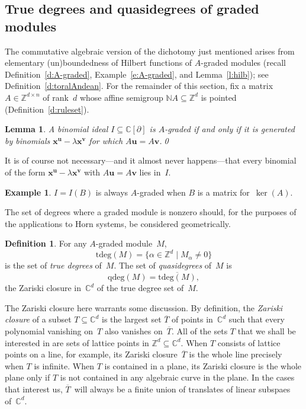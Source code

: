 \documentclass[12pt]{amsart}
\numberwithin{equation}{section}
\newtheorem{lemma}[thm]{Lemma}
\theoremstyle{definition}
\newtheorem{defn}[thm]{Definition}
\newtheorem{example}[thm]{Example}
\begin{document}
\subsection{True degrees and quasidegrees of graded modules}\label{s:degrees}

The commutative algebraic
version of the
dichotomy just mentioned arises from elementary (un)boundedness
of Hilbert functions of $A$-graded modules (recall
Definition~\ref{d:A-graded}, Example~\ref{e:A-graded}, and
Lemma~\ref{l:hilb}); see Definition~\ref{d:toralAndean}.  For the
remainder of this section, fix a matrix $A \in {\mathbb{Z}}^{d \times n}$ of
rank~$d$ whose affine semigroup ${\mathbb{N}} A \subseteq {\mathbb{Z}}^d$ is pointed
(Definition~\ref{d:ruleset}).

\begin{lemma}
A binomial ideal $I \subseteq {\mathbb{C}}[{\partial}]$ is $A$-graded if and only if
it is generated by binomials ${\mathbf{x}}^{\mathbf{u}} - \lambda{\mathbf{x}}^{\mathbf{v}}$ for which
$A{\mathbf{u}} = A{\mathbf{v}}$.\qed
\end{lemma}

It is of course not necessary---and it almost never happens---that
every binomial of the form ${\mathbf{x}}^{\mathbf{u}} - \lambda{\mathbf{x}}^{\mathbf{v}}$ with $A{\mathbf{u}} =
A{\mathbf{v}}$ lies in~$I$.

\begin{example}
$I = I(B)$ is always $A$-graded when $B$ is a matrix for~$\ker(A)$.
\end{example}

The set of degrees where a graded module is nonzero should, for the
purposes of the applications to Horn systems, be considered
geometrically.

\begin{defn}
For any $A$-graded module~$M$,
$$  {\mathrm{tdeg}}(M) = \{\alpha \in {\mathbb{Z}}^d \mid M_\alpha \neq 0\}
$$
is the set of \emph{true degrees} of~$M$.  The set of
\emph{quasidegrees} of~$M$ is
$$  {\mathrm{qdeg}}(M) = {{\overline{{{\mathrm{tdeg}}(M)}}}{}},
$$
the Zariski closure in~${\mathbb{C}}^d$ of the true degree set of~$M$.
\end{defn}

The Zariski closure here warrants some discussion.  By definition, the
\emph{Zariski closure} of a subset $T \subseteq {\mathbb{C}}^d$ is the largest
set ${{{\overline{T}}{}}}$ of points in~${\mathbb{C}}^d$ such that every polynomial vanishing
on~$T$ also vanishes on~${{{\overline{T}}{}}}$.  All of the sets $T$ that we shall be
interested in are sets of lattice points in ${\mathbb{Z}}^d \subseteq {\mathbb{C}}^d$.
When $T$ consists of lattice points on a line, for example, its
Zariski closure~${{{\overline{T}}{}}}$ is the whole line precisely when $T$ is
infinite.  When $T$ is contained in a plane, its Zariski closure is
the whole plane only if $T$ is not contained in any algebraic curve in
the plane.  In the cases that interest us, ${{{\overline{T}}{}}}$~will always be a
finite union of translates of linear subspaes of~${\mathbb{C}}^d$.
\end{document}
